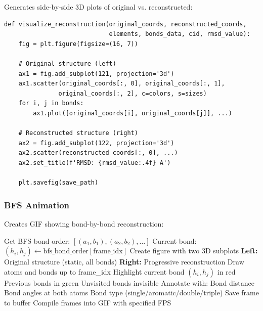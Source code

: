 \documentclass[11pt,a4paper]{article}
\begin{document}
Generates side-by-side 3D plots of original vs. reconstructed:

\begin{lstlisting}[caption={Visualization (lines 1856-1976)}]
def visualize_reconstruction(original_coords, reconstructed_coords,
                             elements, bonds_data, cid, rmsd_value):
    fig = plt.figure(figsize=(16, 7))

    # Original structure (left)
    ax1 = fig.add_subplot(121, projection='3d')
    ax1.scatter(original_coords[:, 0], original_coords[:, 1],
               original_coords[:, 2], c=colors, s=sizes)
    for i, j in bonds:
        ax1.plot([original_coords[i], original_coords[j]], ...)

    # Reconstructed structure (right)
    ax2 = fig.add_subplot(122, projection='3d')
    ax2.scatter(reconstructed_coords[:, 0], ...)
    ax2.set_title(f'RMSD: {rmsd_value:.4f} A')

    plt.savefig(save_path)
\end{lstlisting}

\subsubsection{BFS Animation}

Creates GIF showing bond-by-bond reconstruction:

\begin{algorithm}
\caption{BFS Animation Generation}
\begin{algorithmic}[1]
\State Get BFS bond order: $[(a_1, b_1), (a_2, b_2), \ldots]$
    \State Current bond: $(h_i, h_j) \gets \text{bfs\_bond\_order}[\text{frame\_idx}]$
    \State
    \State Create figure with two 3D subplots
    \State
    \State \textbf{Left:} Original structure (static, all bonds)
    \State
    \State \textbf{Right:} Progressive reconstruction
    \State \quad Draw atoms and bonds up to frame\_idx
    \State \quad Highlight current bond $(h_i, h_j)$ in red
    \State \quad Previous bonds in green
    \State \quad Unvisited bonds invisible
    \State
    \State Annotate with:
    \State \quad Bond distance
    \State \quad Bond angles at both atoms
    \State \quad Bond type (single/aromatic/double/triple)
    \State
    \State Save frame to buffer
\EndFor
\State
\State Compile frames into GIF with specified FPS
\end{algorithmic}
\end{algorithm}
\end{document}
